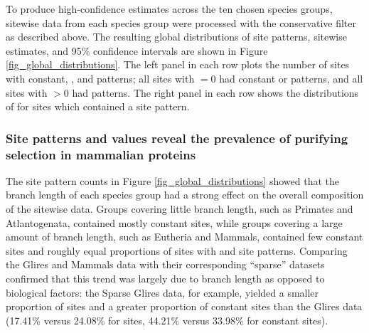 To produce high-confidence \sw estimates across the ten chosen species
groups, sitewise data from each species group were processed with the
conservative filter as described above. The resulting global
distributions of site patterns, sitewise \omgml estimates, and 95\%
confidence intervals are shown in Figure
\ref{fig_global_distributions}. The left panel in each row plots the
number of sites with constant, \syn, and \nsyn patterns; all sites
with \omgml$=0$ had constant or \syn patterns, and all sites with
\omgml$>0$ had \nsyn patterns. The right panel in each row shows the
distributions of \omgml for sites which contained a \nsyn site
pattern.

\subsubsection{Site patterns and \omgml values reveal the prevalence of purifying selection in mammalian proteins}

The site pattern counts in Figure \ref{fig_global_distributions}
showed that the branch length of each species group had a strong
effect on the overall composition of the sitewise data. Groups
covering little branch length, such as Primates and Atlantogenata,
contained mostly constant sites, while groups covering a large amount
of branch length, such as Eutheria and Mammals, contained few constant
sites and roughly equal proportions of sites with \syn and \nsyn site
patterns. Comparing the Glires and Mammals data with their
corresponding ``sparse'' datasets confirmed that this trend was
largely due to branch length as opposed to biological factors: the
Sparse Glires data, for example, yielded a smaller proportion of \nsyn
sites and a greater proportion of constant sites than the Glires data
(17.41\% versus 24.08\% for \nsyn sites, 44.21\% versus 33.98\% for
constant sites).

